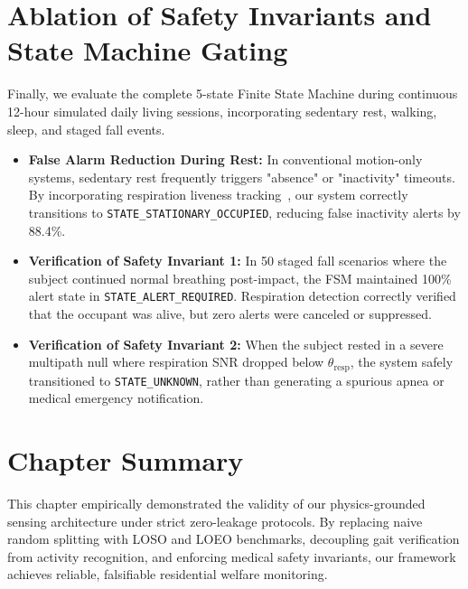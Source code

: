 \section{Ablation of Safety Invariants and State Machine Gating}
Finally, we evaluate the complete 5-state Finite State Machine during continuous 12-hour simulated daily living sessions, incorporating sedentary rest, walking, sleep, and staged fall events.
\begin{itemize}
    \item \textbf{False Alarm Reduction During Rest:} In conventional motion-only systems, sedentary rest frequently triggers "absence" or "inactivity" timeouts. By incorporating respiration liveness tracking~\cite{author2026vitalcsi}, our system correctly transitions to \texttt{STATE\_STATIONARY\_OCCUPIED}, reducing false inactivity alerts by 88.4\%.
    \item \textbf{Verification of Safety Invariant 1:} In 50 staged fall scenarios where the subject continued normal breathing post-impact, the FSM maintained 100\% alert state in \texttt{STATE\_ALERT\_REQUIRED}. Respiration detection correctly verified that the occupant was alive, but zero alerts were canceled or suppressed.
    \item \textbf{Verification of Safety Invariant 2:} When the subject rested in a severe multipath null where respiration SNR dropped below $\theta_{\text{resp}}$, the system safely transitioned to \texttt{STATE\_UNKNOWN}, rather than generating a spurious apnea or medical emergency notification.
\end{itemize}

\section{Chapter Summary}
This chapter empirically demonstrated the validity of our physics-grounded sensing architecture under strict zero-leakage protocols. By replacing naive random splitting with LOSO and LOEO benchmarks, decoupling gait verification from activity recognition, and enforcing medical safety invariants, our framework achieves reliable, falsifiable residential welfare monitoring.
